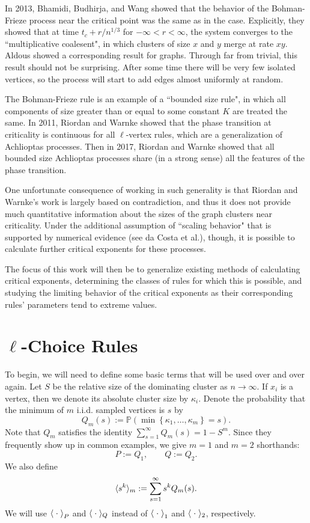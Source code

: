 \documentclass[twoside,10pt]{article}
\begin{document}
In 2013, Bhamidi, Budhirja, and Wang showed that the behavior of the Bohman-Frieze process near the critical point was the same as in the \ER case.\autocite{coal} Explicitly, they showed that at time $t_c + r/n^{1/3}$ for $-\infty<r<\infty$, the system converges to the ``multiplicative coalesent", in which clusters of size $x$ and $y$ merge at rate $xy$. Aldous showed a corresponding result for \ER graphs.\autocite{Aldous} Through far from trivial, this result should not be surprising. After some time there will be very few isolated vertices, so the process will start to add edges almost uniformly at random.

The Bohman-Frieze rule is an example of a ``bounded size rule", in which all components of size greater than or equal to some constant $K$ are treated the same. In 2011, Riordan and Warnke showed that the phase transition at criticality is continuous for all $\ell$-vertex rules,\autocite{RW-cont} which are a generalization of Achlioptas processes. Then in 2017, Riordan and Warnke showed that all bounded size Achlioptas processes share (in a strong sense) all the features of the \ER phase transition.\autocite{RW-bounded} 

One unfortunate consequence of working in such generality is that Riordan and Warnke's work is largely based on contradiction, and thus it does not provide much quantitative information about the sizes of the graph clusters near criticality. Under the additional assumption of ``scaling behavior" that is supported by numerical evidence (see da Costa et al.\autocite{daCosta}), though, it is possible to calculate further critical exponents for these processes.

The focus of this work will then be to generalize existing methods of calculating critical exponents, determining the classes of rules for which this is possible, and studying the limiting behavior of the critical exponents as their corresponding rules' parameters tend to extreme values.

\section{\texorpdfstring{$\ell$}{l}-Choice Rules}

To begin, we will need to define some basic terms that will be used over and over again. Let $S$ be the relative size of the dominating cluster as $n \to \infty$. If $x_i$ is a vertex, then we denote its absolute cluster size by $\kappa_i$. Denote the probability that the minimum of $m$ i.i.d. sampled vertices is $s$ by
\[
	Q_m(s) := \mathbb{P}\left( \min\left\{ \kappa_1, \dots, \kappa_m \right\} = s \right) .
\]
Note that $Q_m$ satisfies the identity $\sum_{s=1}^{\infty} Q_m(s) = 1-S^{m}$. Since they frequently show up in common examples, we give $m=1$ and $m=2$ shorthands:
\[
	P := Q_1, \quad\quad Q := Q_2.
\]
We also define
\[
	\langle s^{k} \rangle_{m} := \sum_{s=1}^{\infty} s^{k} Q_m(s).
\]
We will use $\left\langle \;\cdot\; \right\rangle_{P}$ and $\langle \;\cdot\; \rangle_{Q}$ instead of $\left\langle \;\cdot\; \right\rangle_{1}$ and $\langle \;\cdot\; \rangle_{2}$, respectively.
\end{document}
